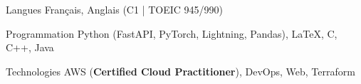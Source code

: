 

\begin{cvskills}

  \cvskill
    {Langues} %
    {Français, Anglais (C1 | TOEIC 945/990)} %

  \cvskill
    {Programmation} %
    {Python (FastAPI, PyTorch, Lightning, Pandas), \LaTeX, C, C++, Java} %

  \cvskill
    {Technologies} %
    {AWS (\textbf{Certified Cloud Practitioner}), DevOps, Web, Terraform} %

\end{cvskills}
